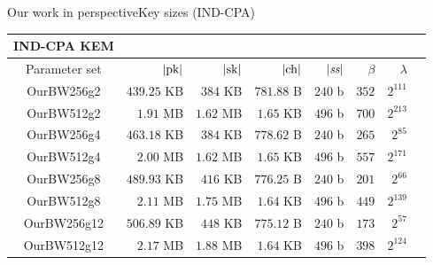 \documentclass[10pt]{beamer}
\begin{document}
\begin{frame}{Our work in perspective}{Key sizes (IND-CPA)}

				\begin{table}[htbp]
								\centering
								\small
								\setlength{\tabcolsep}{5pt}
								\begin{tabular}{crrrrrrc}
												\toprule
												IND-CPA KEM & & & & & & & \\
												\midrule
												Parameter set & $|\pk|$ & $|\sk|$ & $|\ch|$ & $|\ss|$ & $\beta$ & $\lambda$ \\
												\midrule
												OurBW256g2 & $ 439.25$ KB & $384$ KB & $ 781.88$ B & $240$ b & $352$ & $2^{111}$ \\
												OurBW512g2 & $ 1.91$ MB & $ 1.62$ MB & $ 1.65$ KB & $496$ b & $700$ & $2^{213}$ \\
												OurBW256g4 & $ 463.18$ KB & $384$ KB & $ 778.62$ B & $240$ b & $265$ & $2^{85}$ \\
												OurBW512g4 & $ 2.00$ MB & $ 1.62$ MB & $ 1.65$ KB & $496$ b & $557$ & $2^{171}$ \\
												OurBW256g8 & $ 489.93$ KB & $416$ KB & $ 776.25$ B & $240$ b & $201$ & $2^{66}$ \\
												OurBW512g8 & $ 2.11$ MB & $ 1.75$ MB & $ 1.64$ KB & $496$ b & $449$ & $2^{139}$ \\
												OurBW256g12 & $ 506.89$ KB & $448$ KB & $ 775.12$ B & $240$ b & $173$ & $2^{57}$ \\
												OurBW512g12 & $ 2.17$ MB & $ 1.88$ MB & $ 1.64$ KB & $496$ b & $398$ & $2^{124}$ \\
												\bottomrule
								\end{tabular}
				\end{table}
\end{frame}
\end{document}
